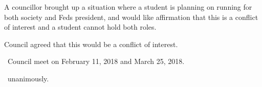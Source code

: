 \begin{information}
    A councillor brought up a situation where a student is planning on running
    for both society and Feds president, and would like affirmation that this
    is a conflict of interest and a student cannot hold both roles.

    Council agreed that this would be a conflict of interest.
\end{information}

\begin{motion}
    \birt\ Council meet on February 11, 2018 and March 25, 2018. 
    \movers{\antonio}{\seneca}

    \carries\ unanimously.
\end{motion}
